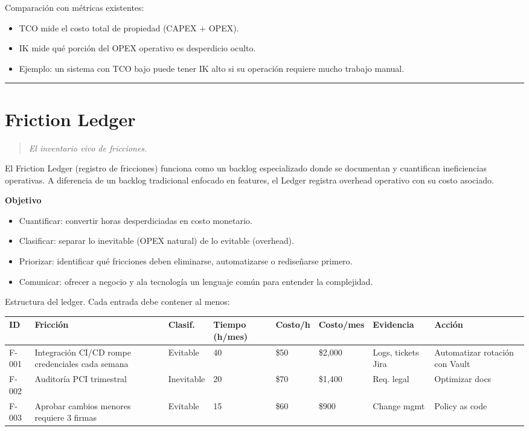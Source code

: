 Comparación con métricas existentes:

\begin{itemize}
    \item TCO mide el costo total de propiedad (CAPEX + OPEX).
    \item IK mide qué porción del OPEX operativo es desperdicio oculto.
    \item Ejemplo: un sistema con TCO bajo puede tener IK alto si su operación requiere mucho trabajo manual.
\end{itemize}

\hrule
\section{Friction Ledger}
\begin{quote}
\textit{El inventario vivo de fricciones.}
\end{quote}

El Friction Ledger (registro de fricciones) funciona como un backlog especializado donde se documentan y cuantifican ineficiencias operativas. 
A diferencia de un backlog tradicional enfocado en features, el Ledger registra overhead operativo con su costo asociado.

\textbf{Objetivo}
\begin{itemize}
    \item Cuantificar: convertir horas desperdiciadas en costo monetario.
    \item Clasificar: separar lo inevitable (OPEX natural) de lo evitable (overhead).
    \item Priorizar: identificar qué fricciones deben eliminarse, automatizarse o rediseñarse primero.
    \item Comunicar: ofrecer a negocio y ala tecnología un lenguaje común para entender la complejidad.
\end{itemize}

Estructura del ledger. Cada entrada debe contener al menos:

\begin{table}[h]
\centering
\scriptsize
\begin{tabular}{|l|p{2.2cm}|l|l|l|l|p{1.8cm}|p{2.2cm}|}
\hline
ID & Fricción & Clasif. & Tiempo (h/mes) & Costo/h & Costo/mes & Evidencia & Acción \\ \hline
F-001 & Integración CI/CD rompe credenciales cada semana & Evitable & 40 & \$50 & \$2,000 & Logs, tickets Jira & Automatizar rotación con Vault \\ \hline
F-002 & Auditoría PCI trimestral & Inevitable & 20 & \$70 & \$1,400 & Req. legal & Optimizar docs \\ \hline
F-003 & Aprobar cambios menores requiere 3 firmas & Evitable & 15 & \$60 & \$900 & Change mgmt & Policy as code \\ \hline
\end{tabular}
\end{table}

